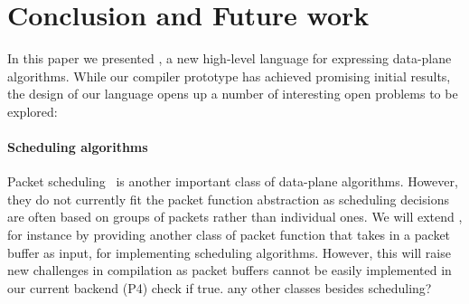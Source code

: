 \section{Conclusion and Future work}
\label{s:future}






%
%


\label{s:future}

In this paper we presented \pktlanguage, a new high-level language for expressing 
data-plane
algorithms. While our compiler prototype has achieved promising initial results, 
the design of our language opens up 
a number of interesting open problems to be explored:

\paragraph{Scheduling algorithms}
Packet scheduling~\cite{XXX, XXX} is another important class of data-plane algorithms.
However, they do not currently fit the \pktlanguage packet function abstraction
as scheduling decisions are often based on groups of packets rather than individual
ones. We will extend \pktlanguage, for instance by providing another class of packet
function that takes in a packet buffer as input, for implementing scheduling algorithms.
However, this will raise new challenges in compilation as packet buffers cannot be
easily implemented in our current backend (P4) \ac{check if true}.
\ac{any other classes besides scheduling?}

